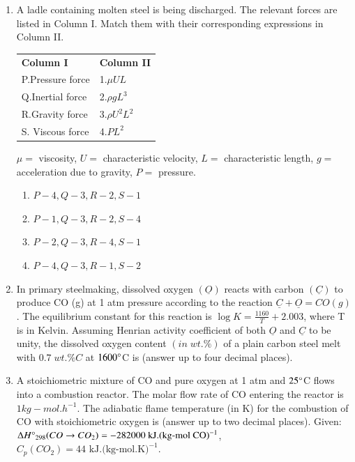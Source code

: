 \documentclass[journal]{IEEEtran}
\theoremstyle{remark}
\begin{document}
\begin{enumerate}
\item A ladle containing molten steel is being discharged. The relevant forces are listed in Column I. Match them with their corresponding expressions in Column II. \hfill{}
\begin{center}
\begin{tabular}{ll}
\textbf{Column I} & \textbf{Column II} \\
P.Pressure force & 1.$\mu UL$ \\
Q.Inertial force & 2.$\rho g L^3$ \\
R.Gravity force & 3.$\rho U^2 L^2$ \\
S. Viscous force & 4.$P L^2$ \\
\end{tabular}
\end{center}
$\mu=$ viscosity, $U=$ characteristic velocity, $L=$ characteristic length, $g=$ acceleration due to gravity, $P=$ pressure.
\begin{multicols}{2}
\begin{enumerate}
    \item $P-4, Q-3, R-2, S-1$
    \item $P-1, Q-3, R-2, S-4$
    \item $P-2, Q-3, R-4, S-1$
    \item $P-4, Q-3, R-1, S-2$
\end{enumerate}
\end{multicols}

\item In primary steelmaking, dissolved oxygen $(\underline{O})$ reacts with carbon $(\underline{C})$ to produce CO (g) at 1 atm pressure according to the reaction $\underline{C} + \underline{O} = CO(g)$. The equilibrium constant for this reaction is $\log K = \frac{1160}{T} + 2.003$, where T is in Kelvin. Assuming Henrian activity coefficient of both $\underline{O}$ and $\underline{C}$ to be unity, the dissolved oxygen content $(in\; wt.\%)$ of a plain carbon steel melt with $0.7\; wt.\% C$ at $1600\degree$C is \underline {\hspace{2cm}} (answer up to four decimal places). \hfill{}

\item A stoichiometric mixture of CO and pure oxygen at 1 atm and $25\degree$C flows into a combustion reactor. The molar flow rate of CO entering the reactor is $1 kg-mol.h^{-1}$. The adiabatic flame temperature (in K) for the combustion of CO with stoichiometric oxygen is \underline {\hspace{2cm}} (answer up to two decimal places). Given: $\Delta H\degree_{298}(CO \rightarrow CO_2) = -282000 \text{ kJ.(kg-mol CO)}^{-1}$, $C_p(CO_2) = 44 \text{ kJ.(kg-mol.K)}^{-1}$. \hfill{}


\end{enumerate}
\end{document}
